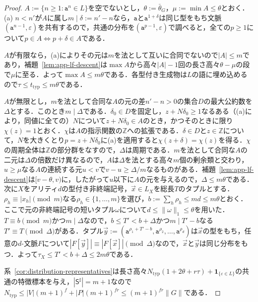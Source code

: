 \documentclass[11pt,a4paper]{ltjsarticle}
\numberwithin{equation}{section}
\theoremstyle{plain}
\theoremstyle{definition}
\theoremstyle{remark}
\newcommand{\tuple}[1]{\vec{#1}}
\newcommand{\eps}{\varepsilon}
\begin{document}
\begin{proof}
$A:=\{n\ge1:\mathtt a^n\in L\}$を空でないとし，$\theta:=\bar\theta_G$，$\mu:=\min A\le\theta$とおく．(a) $n<n'$が$A$に属し$m\mid\delta:=n'-n$なら，$\mathtt a$と$\mathtt a^{1+\delta}$は同じ型をもち文脈$(\mathtt a^{n-1},\eps)$を共有するので，共通の分布を$(\mathtt a^{p-1},\eps)$で調べると，全ての$p\ge1$について$p\in A\iff p+\delta\in A$である．

$A$が有限なら，(a)によりその元は$m$を法として互いに合同でないので$|A|\le m$であり，補題~\ref{lem:app-lf-descent}は$\max A$から高々$|A|-1$回の長さ高々$\theta-\mu$の段で$\mu$に至る．よって$\max A\le m\theta$である．各型付き生成物は$L$の語に埋め込めるので$\tau\le t_{\mathrm{typ}}\le m\theta$である．

$A$が無限とし，$m$を法として合同な$A$の元の差$n'-n>0$の集合$D$の最大公約数を$\Delta$とする．このとき$m\mid\Delta$である．$\delta_0\in D$を固定し，$z+N\delta_0\ge1$なるある（(a)により，同値に全ての）$N$について$z+N\delta_0\in A$のとき，かつそのときに限り$\chi(z)=1$とおく．$\chi$は$A$の指示関数の$\mathbb Z$への拡張である．$\delta\in D$と$z\in\mathbb Z$について，$N$を大きくとり$p=z+N\delta_0$に(a)を適用すると$\chi(z+\delta)=\chi(z)$を得る．$\chi$の周期全体は$\mathbb Z$の部分群をなすので，$\Delta$は周期である．$m$を法として合同な$A$の二元は$\Delta$の倍数だけ異なるので，$A$は$\Delta$を法とする高々$m$個の剰余類と交わり，$u\ge\mu$なる$A$の連続する元$u<v$で$v-u\ge\Delta/m$なるものがある．補題~\ref{lem:app-lf-descent}は$[v-\theta,v)$に，したがって$u$以下に$A$の元を与えるので，$\Delta\le m\theta$である．次に$X$をアリティ$d$の型付き非終端記号，$\tuple x\in L_X$を総長$T$のタプルとする．$\rho_h\equiv|x_h|\pmod m$なる$\rho_h\in\{1,\ldots,m\}$を選び，$b:=\sum_h\rho_h\le md\le m\theta$とおく．ここで元の非終端記号の短いタプル$\omega$について$d\le\|\omega\|_1\le\theta$を用いた．$T\equiv b\pmod m$かつ$m\mid\Delta$なので，$b\le T'<b+\Delta$かつ$m\mid T'-b$なる$T'\equiv T\pmod\Delta$がある．タプル$\tuple y:=(\mathtt a^{\rho_1+T'-b},\mathtt a^{\rho_2},\ldots,\mathtt a^{\rho_d})$は$\tuple x$の型をもち，任意の$d$-文脈$F$について$|F[\tuple y]|\equiv|F[\tuple x]|\pmod\Delta$なので，$\tuple x$と$\tuple y$は同じ分布をもつ．よって$\tau_X\le T'<b+\Delta\le2m\theta$である．

系~\ref{cor:distribution-representatives}は長さ高々$N_{\mathrm{typ}}(1+2\theta+r\tau)+\mathbf 1_{\{\eps\in L\}}$の共通の特徴標本を与え，$|\mathsf S^\sharp|=m+1$なので$N_{\mathrm{typ}}\le|V|(m+1)^f+|P|(m+1)^{fr}\le(m+1)^{fr}\|G\|$である．
\end{proof}
\end{document}
